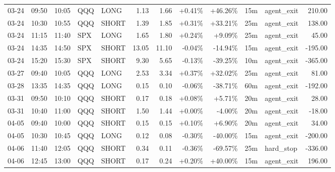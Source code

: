 \documentclass[11pt,a4paper]{article}
\begin{document}
\begin{center}
\begin{longtable}{>{\color{txtmain}}l l l l l r r r r r >{\color{txtmain}}l r}
03-24 & 09:50 & 10:05 & QQQ & LONG & 1.13 & 1.66 & \textcolor{wingreen}{+0.41\%} & \textcolor{wingreen}{+46.26\%} & 15m & agent\_exit & \textcolor{wingreen}{210.00} \\
03-24 & 10:30 & 10:55 & QQQ & SHORT & 1.39 & 1.85 & \textcolor{wingreen}{+0.31\%} & \textcolor{wingreen}{+33.21\%} & 25m & agent\_exit & \textcolor{wingreen}{138.00} \\
03-24 & 11:15 & 11:40 & SPX & LONG & 1.65 & 1.80 & \textcolor{wingreen}{+0.24\%} & \textcolor{wingreen}{+9.09\%} & 25m & agent\_exit & \textcolor{wingreen}{45.00} \\
03-24 & 14:35 & 14:50 & SPX & SHORT & 13.05 & 11.10 & \textcolor{lossred}{-0.04\%} & \textcolor{lossred}{-14.94\%} & 15m & agent\_exit & \textcolor{lossred}{-195.00} \\
03-24 & 15:20 & 15:30 & SPX & SHORT & 9.30 & 5.65 & \textcolor{lossred}{-0.13\%} & \textcolor{lossred}{-39.25\%} & 10m & agent\_exit & \textcolor{lossred}{-365.00} \\
03-27 & 09:40 & 10:05 & QQQ & LONG & 2.53 & 3.34 & \textcolor{wingreen}{+0.37\%} & \textcolor{wingreen}{+32.02\%} & 25m & agent\_exit & \textcolor{wingreen}{81.00} \\
03-28 & 13:35 & 14:35 & QQQ & LONG & 0.15 & 0.10 & \textcolor{lossred}{-0.06\%} & \textcolor{lossred}{-38.71\%} & 60m & agent\_exit & \textcolor{lossred}{-192.00} \\
03-31 & 09:50 & 10:10 & QQQ & SHORT & 0.17 & 0.18 & \textcolor{wingreen}{+0.08\%} & \textcolor{wingreen}{+5.71\%} & 20m & agent\_exit & \textcolor{wingreen}{28.00} \\
03-31 & 10:40 & 11:00 & QQQ & SHORT & 1.50 & 1.44 & \textcolor{wingreen}{+0.00\%} & \textcolor{lossred}{-4.00\%} & 20m & agent\_exit & \textcolor{lossred}{-18.00} \\
04-05 & 09:40 & 10:00 & QQQ & SHORT & 0.15 & 0.15 & \textcolor{wingreen}{+0.10\%} & \textcolor{wingreen}{+6.90\%} & 20m & agent\_exit & \textcolor{wingreen}{34.00} \\
04-05 & 10:30 & 10:45 & QQQ & LONG & 0.12 & 0.08 & \textcolor{lossred}{-0.30\%} & \textcolor{lossred}{-40.00\%} & 15m & agent\_exit & \textcolor{lossred}{-200.00} \\
04-06 & 11:40 & 12:05 & QQQ & SHORT & 0.34 & 0.11 & \textcolor{lossred}{-0.36\%} & \textcolor{lossred}{-69.57\%} & 25m & hard\_stop & \textcolor{lossred}{-336.00} \\
04-06 & 12:45 & 13:00 & QQQ & SHORT & 0.17 & 0.24 & \textcolor{wingreen}{+0.20\%} & \textcolor{wingreen}{+40.00\%} & 15m & agent\_exit & \textcolor{wingreen}{196.00} \\

\end{longtable}
\end{center}
\end{document}
